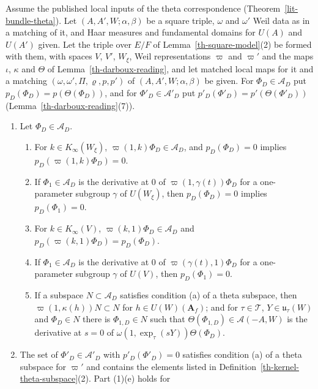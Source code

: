 \begin{lemma}\label{th-kernel-dictionary}
Assume the published local inputs of the theta correspondence
(Theorem~\ref{lit-bundle-theta}). Let $(A,A',W;\alpha,\beta)$ be a square
triple, $\omega$ and $\omega'$ Weil data as in a matching of it, and Haar
measures and fundamental domains for $U(A)$ and $U(A')$ given. Let the triple
over $E/F$ of Lemma~\ref{th-square-model}(2) be formed with them, with spaces
$V$, $V'$, $W_\xi$, Weil representations $\varpi$ and $\varpi'$ and the maps
$\iota$, $\kappa$ and $\Theta$ of Lemma~\ref{th-darboux-reading}, and let
matched local maps for it and a matching $(\omega,\omega',\Pi,\varrho,p,p')$ of
$(A,A',W;\alpha,\beta)$ be given. For $\Phi_D\in\mathcal A_D$ put
$p_D(\Phi_D)=p(\Theta(\Phi_D))$, and for $\Phi'_D\in\mathcal A'_D$ put
$p'_D(\Phi'_D)=p'(\Theta(\Phi'_D))$
(Lemma~\ref{th-darboux-reading}(7)).
\begin{enumerate}
\item Let $\Phi_D\in\mathcal A_D$.
  \begin{enumerate}
  \item[(a)] For $k\in K_\infty(W_\xi)$, $\varpi(1,k)\Phi_D\in\mathcal A_D$,
    and $p_D(\Phi_D)=0$ implies $p_D(\varpi(1,k)\Phi_D)=0$.
  \item[(b)] If $\Phi_1\in\mathcal A_D$ is the derivative at $0$ of
    $\varpi(1,\gamma(t))\Phi_D$ for a one-parameter subgroup $\gamma$ of
    $U(W_\xi)$, then $p_D(\Phi_D)=0$ implies $p_D(\Phi_1)=0$.
  \item[(c)] For $k\in K_\infty(V)$, $\varpi(k,1)\Phi_D\in\mathcal A_D$ and
    $p_D(\varpi(k,1)\Phi_D)=p_D(\Phi_D)$.
  \item[(d)] If $\Phi_1\in\mathcal A_D$ is the derivative at $0$ of
    $\varpi(\gamma(t),1)\Phi_D$ for a one-parameter subgroup $\gamma$ of
    $U(V)$, then $p_D(\Phi_1)=0$.
  \item[(e)] If a subspace $N\subset\mathcal A_D$ satisfies condition (a) of a
    theta subspace, then $\varpi(1,\kappa(h))N\subset N$ for
    $h\in U(W)(\mathbf A_f)$; and for $\tau\in\mathcal T$,
    $Y\in\mathfrak u_\tau(W)$ and $\Phi_D\in N$ there is $\Phi_{1,D}\in N$
    such that $\Theta(\Phi_{1,D})\in\mathcal A(-A,W)$ is the derivative at
    $s=0$ of $\omega(1,\exp_\tau(sY))\Theta(\Phi_D)$.
  \end{enumerate}
\item The set of $\Phi'_D\in\mathcal A'_D$ with $p'_D(\Phi'_D)=0$ satisfies
  condition (a) of a theta subspace for $\varpi'$ and contains the elements
  listed in Definition~\ref{th-kernel-theta-subspace}(2). Part (1)(e) holds for

\end{enumerate}
\end{lemma}
